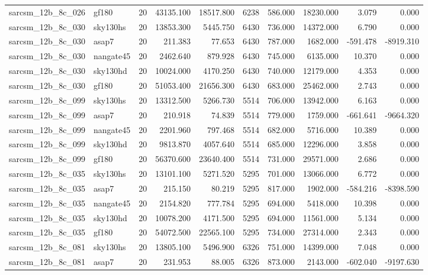 \begin{tabular}{llrrrrrrrr}
sarcsm\_12b\_8c\_026 & gf180 & 20 & 43135.100 & 18517.800 & 6238 & 586.000 & 18230.000 & 3.079 & 0.000 \\
sarcsm\_12b\_8c\_030 & sky130hs & 20 & 13853.300 & 5445.750 & 6430 & 736.000 & 14372.000 & 6.790 & 0.000 \\
sarcsm\_12b\_8c\_030 & asap7 & 20 & 211.383 & 77.653 & 6430 & 787.000 & 1682.000 & -591.478 & -8919.310 \\
sarcsm\_12b\_8c\_030 & nangate45 & 20 & 2462.640 & 879.928 & 6430 & 745.000 & 6135.000 & 10.370 & 0.000 \\
sarcsm\_12b\_8c\_030 & sky130hd & 20 & 10024.000 & 4170.250 & 6430 & 740.000 & 12179.000 & 4.353 & 0.000 \\
sarcsm\_12b\_8c\_030 & gf180 & 20 & 51053.400 & 21656.300 & 6430 & 683.000 & 25462.000 & 2.743 & 0.000 \\
sarcsm\_12b\_8c\_099 & sky130hs & 20 & 13312.500 & 5266.730 & 5514 & 706.000 & 13942.000 & 6.163 & 0.000 \\
sarcsm\_12b\_8c\_099 & asap7 & 20 & 210.918 & 74.839 & 5514 & 779.000 & 1759.000 & -661.641 & -9664.320 \\
sarcsm\_12b\_8c\_099 & nangate45 & 20 & 2201.960 & 797.468 & 5514 & 682.000 & 5716.000 & 10.389 & 0.000 \\
sarcsm\_12b\_8c\_099 & sky130hd & 20 & 9813.870 & 4057.640 & 5514 & 685.000 & 12296.000 & 3.858 & 0.000 \\
sarcsm\_12b\_8c\_099 & gf180 & 20 & 56370.600 & 23640.400 & 5514 & 731.000 & 29571.000 & 2.686 & 0.000 \\
sarcsm\_12b\_8c\_035 & sky130hs & 20 & 13101.100 & 5271.520 & 5295 & 701.000 & 13066.000 & 6.772 & 0.000 \\
sarcsm\_12b\_8c\_035 & asap7 & 20 & 215.150 & 80.219 & 5295 & 817.000 & 1902.000 & -584.216 & -8398.590 \\
sarcsm\_12b\_8c\_035 & nangate45 & 20 & 2154.820 & 777.784 & 5295 & 694.000 & 5418.000 & 10.398 & 0.000 \\
sarcsm\_12b\_8c\_035 & sky130hd & 20 & 10078.200 & 4171.500 & 5295 & 694.000 & 11561.000 & 5.134 & 0.000 \\
sarcsm\_12b\_8c\_035 & gf180 & 20 & 54072.500 & 22565.100 & 5295 & 734.000 & 27314.000 & 2.343 & 0.000 \\
sarcsm\_12b\_8c\_081 & sky130hs & 20 & 13805.100 & 5496.900 & 6326 & 751.000 & 14399.000 & 7.048 & 0.000 \\
sarcsm\_12b\_8c\_081 & asap7 & 20 & 231.953 & 88.005 & 6326 & 873.000 & 2143.000 & -602.040 & -9197.630 \\

\end{tabular}
